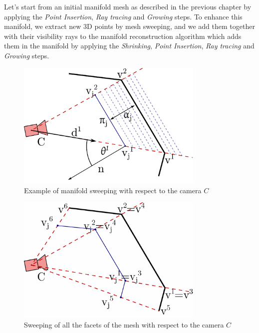 Let's start from an initial manifold mesh as described in the previous chapter by applying the   \emph{Point Insertion}, \emph{Ray tracing} and \emph{Growing} steps.
To enhance this manifold, we extract new 3D points by mesh sweeping, and we add them together with their visibility rays to the manifold reconstruction algorithm which adds them in the manifold by applying the \emph{Shrinking}, \emph{Point Insertion}, \emph{Ray tracing} and \emph{Growing} steps.


\begin{figure}[tp]
  \centering
  \includegraphics[width=0.8\textwidth]{././img/ch-sweep/sweep.pdf}
  \caption{Example of manifold sweeping with respect to the camera $C$}
  \label{fig:sweep}
\end{figure}


\begin{figure}[tp]
  \centering
  \includegraphics[width=0.8\textwidth]{./img/ch-sweep/sweepMulti.pdf}
  \caption{Sweeping of all the facets of the mesh with respect to the camera $C$}
  \label{fig:sweepMulti}
\end{figure}


